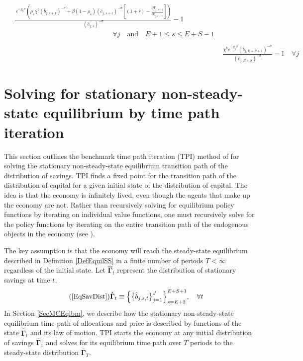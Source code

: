 \begin{enumerate}
\begin{align}
\begin{split}
          &\frac{e^{-g_y\sigma}\left(\rho_s\chi^b \left(\bar{b}_{j,s+1}\right)^{-\sigma} + \beta(1-\rho_s)(\bar{c}_{j,s+1})^{-\sigma}\left[(1 + \bar{r}) - \frac{\partial \bar{T}_{j,s+1}}{\partial \bar{b}_{j,s+1}}\right]\right)}{(\bar{c}_{j,s})^{-\sigma}} - 1 \\
          &\qquad\qquad\qquad\qquad\qquad\qquad\qquad\forall j \quad\text{and}\quad E+1\leq s\leq E+S-1 \\
        \end{split} \label{EqSSeulerrSav} \\
        &\frac{\chi^b e^{-g_y\sigma}(\bar{b}_{j,E+S+1})^{-\sigma}}{\left(\bar{c}_{j,E+S}\right)^{-\sigma}} - 1 \quad\forall j \label{EqSSeulerrBeq}
      \end{align}
  \end{enumerate}


\newpage
\section{Solving for stationary non-steady-state equilibrium by time path iteration}\label{AppNonSSsolve}

  \setcounter{equation}{0}

  This section outlines the benchmark time path iteration (TPI) method of \citet{AuerbachKotlikoff:1987} for solving the stationary non-steady-state equilibrium transition path of the distribution of savings. TPI finds a fixed point for the transition path of the distribution of capital for a given initial state of the distribution of capital. The idea is that the economy is infinitely lived, even though the agents that make up the economy are not. Rather than recursively solving for equilibrium policy functions by iterating on individual value functions, one must recursively solve for the policy functions by iterating on the entire transition path of the endogenous objects in the economy (see \citet[ch. 17]{StokeyLucas:1989}).

  The key assumption is that the economy will reach the steady-state equilibrium described in Definition \ref{DefEquilSS} in a finite number of periods $T<\infty$ regardless of the initial state. Let $\bm{\hat{\Gamma}}_t$ represent the distribution of stationary savings at time $t$.
  \begin{equation}\tag{\ref{EqSavDist}}
    \bm{\hat{\Gamma}}_t \equiv \Bigl\{\bigl\{\hat{b}_{j,s,t}\bigr\}_{j=1}^J\Bigr\}_{s=E+2}^{E+S+1}, \quad\forall t
  \end{equation}
  In Section \ref{SecMCEqlbm}, we describe how the stationary non-steady-state equilibrium time path of allocations and price is described by functions of the state $\bm{\hat{\Gamma}}_t$ and its law of motion. TPI starts the economy at any initial distribution of savings $\bm{\hat{\Gamma}}_1$ and solves for its equilibrium time path over $T$ periods to the steady-state distribution $\bm{\bar{\Gamma}}_T$.

